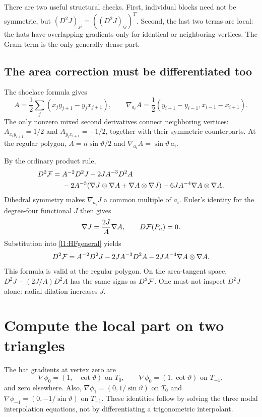 There are two useful structural checks. First, individual blocks need not
be symmetric, but $(D^2J)_{ji}=((D^2J)_{ij})^T$. Second, the last two terms
are local: the hats have overlapping gradients only for identical or
neighboring vertices. The Gram term is the only generally dense part.

\subsection{The area correction must be differentiated too}
The shoelace formula gives
\[
 A=\frac12\sum_j(x_jy_{j+1}-y_jx_{j+1}),\qquad
 \nabla_{a_i}A=\frac12(y_{i+1}-y_{i-1},x_{i-1}-x_{i+1}).
\]
The only nonzero mixed second derivatives connect neighboring vertices:
$A_{x_i y_{i+1}}=1/2$ and $A_{y_i x_{i+1}}=-1/2$, together with their
symmetric counterparts. At the regular polygon,
$A=n\sin\vartheta/2$ and $\nabla_{a_i}A=\sin\vartheta\,a_i$.

By the ordinary product rule,
\begin{align}
 D^2\mathcal F={}&A^{-2}D^2J-2JA^{-3}D^2A\notag\\
 &-2A^{-3}(\nabla J\otimes\nabla A+\nabla A\otimes\nabla J)
 +6JA^{-4}\nabla A\otimes\nabla A.
 \label{l1:HFgeneral}
\end{align}
Dihedral symmetry makes $\nabla_{a_i}J$ a common multiple of $a_i$.
Euler's identity for the degree-four functional $J$ then gives
\[
 \nabla J=\frac{2J}{A}\nabla A,
 \qquad D\mathcal F(P_n)=0.
\]
Substitution into \eqref{l1:HFgeneral} yields
\begin{equation}
 D^2\mathcal F=A^{-2}D^2J-2JA^{-3}D^2A
              -2JA^{-4}\nabla A\otimes\nabla A.
 \label{l1:HF}
\end{equation}
This formula is valid at the regular polygon. On the area-tangent space,
$D^2J-(2J/A)D^2A$ has the same signs as $D^2\mathcal F$.
One must not inspect $D^2J$ alone: radial dilation increases $J$.

\section{Compute the local part on two triangles}
\label{l1:local}
The hat gradients at vertex zero are
\[
 \nabla\phi_0=(1,-\cot\vartheta)\text{ on }T_0,
 \qquad
 \nabla\phi_0=(1,\cot\vartheta)\text{ on }T_{-1},
\]
and zero elsewhere. Also,
$\nabla\phi_1=(0,1/\sin\vartheta)$ on $T_0$ and
$\nabla\phi_{-1}=(0,-1/\sin\vartheta)$ on $T_{-1}$.
These identities follow by solving the three nodal interpolation equations,
not by differentiating a trigonometric interpolant.

